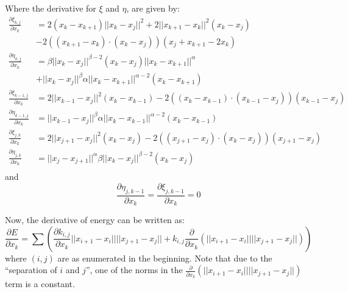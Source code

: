 \documentclass[a4paper]{article}
\newcommand{\norm}[1]{||#1||}
\begin{document}
Where the derivative for $\xi$ and $\eta$, are given by:
\begin{align}
    \frac{\partial \xi_{k,j}}{\partial x_k} &= 2\left( x_k - x_{k+1} \right) \norm{x_k - x_j}^2 + 2 \norm{x_{k+1} - x_k}^2 (x_k - x_j) \nonumber \\
    & -2 \left( \left( x_{k+1} - x_k \right) \cdot \left( x_k - x_j \right) \right) \left( x_j + x_{k+1} - 2 x_k \right) \\
    \frac{\partial \eta_{k,j}}{\partial x_k} &= \beta \norm{x_k - x_j}^{\beta - 2} (x_k - x_j) \norm{x_k - x_{k+1}}^{\alpha} \nonumber\\
    &+ \norm{x_k - x_j}^{\beta} \alpha \norm{x_k - x_{k+1}}^{\alpha - 2} (x_k - x_{k+1}) \\
    \frac{\partial \xi_{k-1,j}}{\partial x_k} &= 2 \norm{x_{k-1} - x_j}^2 (x_k - x_{k-1}) - 2 \left( \left( x_k - x_{k-1} \right) \cdot \left( x_{k-1} - x_j \right) \right) (x_{k-1} -x_j) \\
    \frac{\partial \eta_{k-1,j}}{\partial x_k} &= \norm{x_{k-1} - x_j}^{\beta} \alpha \norm{x_{k} - x_{k-1}}^{\alpha - 2} (x_{k} - x_{k-1}) \\
    \frac{\partial \xi_{j,k}}{\partial x_k} &= 2 \norm{x_{j+1} - x_j}^2 (x_k - x_j) - 2 \left( \left( x_{j+1} - x_{j} \right) \cdot \left( x_{k} - x_{j} \right) \right) \left( x_{j+1} - x_j \right) \\
    \frac{\partial \eta_{j,k}}{\partial x_k} &= \norm{x_j - x_{j+1}}^{\alpha} \beta \norm{x_k - x_j}^{\beta - 2} \left( x_k - x_j \right) \\
\end{align}
and
\begin{equation}
    \frac{\partial \eta_{j, k-1}}{\partial x_k} = \frac{\partial \xi_{j,k-1}}{\partial x_k} = 0
\end{equation}

Now, the derivative of energy can be written as:
\begin{equation}
    \frac{\partial E}{\partial x_k} = \sum \left( \frac{\partial k_{i,j}}{\partial x_k} \norm{x_{i+1} - x_i} \norm{x_{j+1} - x_j} + k_{i,j} \frac{\partial}{\partial x_k} \left( \norm{x_{i+1} - x_{i}} \norm{x_{j+1} - x_j} \right) \right)
\end{equation}
where $\left( i,j \right)$ are as enumerated in the beginning.
Note that due to the ``separation of $i$ and $j$'', one of the norms in the 
$\frac{\partial}{\partial x_k} \left( \norm{x_{i+1} - x_{i}} \norm{x_{j+1} - x_j} \right)$ term is a constant.
\end{document}
